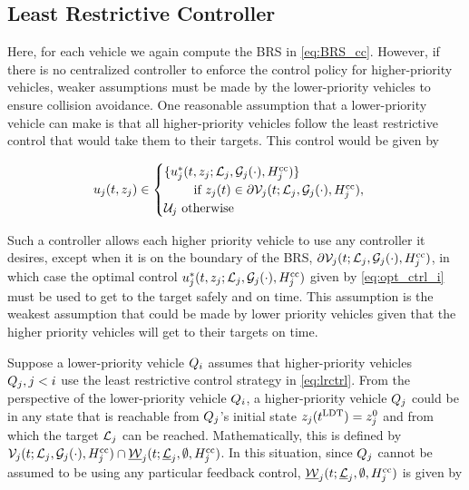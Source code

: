\subsection{Least Restrictive Controller}
\label{sec:incomp_LRctrl}
Here, for each vehicle we again compute the BRS in \eqref{eq:BRS_cc}. However, if there is no centralized controller to enforce the control policy for higher-priority vehicles, weaker assumptions must be made by the lower-priority vehicles to ensure collision avoidance. One reasonable assumption that a lower-priority vehicle can make is that all higher-priority vehicles follow the least restrictive control that would take them to their targets. This control would be given by 

\begin{equation}
\label{eq:lrctrl} %
\ctrl_j(t, \state_j)\in \begin{cases} \{\ctrl_j^*(t, \state_j; \targetset_j, \obsset_j(\cdot), \ccham_j) \} \\ \qquad \text{ if } \state_j(t)\in \partial \brs_j(t; \targetset_j, \obsset_j(\cdot), \ccham_j), \\
\cset_j  \text{ otherwise}
\end{cases}
\end{equation}

Such a controller allows each higher priority vehicle to use any controller it desires, except when it is on the boundary of the BRS, $\partial \mathcal{V}_j(t; \mathcal{L}_j, \mathcal{G}_j(\cdot), H^\text{cc}_j)$, in which case the optimal control $u_j^*(t, z_j; \mathcal{L}_j, \mathcal{G}_j(\cdot), H^\text{cc}_j)$ given by \eqref{eq:opt_ctrl_i} must be used to get to the target safely and on time. This assumption is the weakest assumption that could be made by lower priority vehicles given that the higher priority vehicles will get to their targets on time.

Suppose a lower-priority vehicle $Q_{i}$ assumes that higher-priority vehicles $Q_{j}, j < i$ use the least restrictive control strategy in \eqref{eq:lrctrl}. From the perspective of the lower-priority vehicle $Q_{i}$, a higher-priority vehicle $Q_{j}$ could be in any state that is reachable from $Q_{j}$'s initial state $z_j(t^\text{LDT}) =z_j^0$ and from which the target $\mathcal{L}_j$ can be reached. Mathematically, this is defined by $\mathcal{V}_j(t; \mathcal{L}_j, \mathcal{G}_j(\cdot), H^\text{cc}_j) \cap \underline{\mathcal{W}}_j(t; \underline{\mathcal{L}}_j, \emptyset, H^\text{cc}_j)$. In this situation, since $Q_{j}$ cannot be assumed to be using any particular feedback control, $\underline{\mathcal{W}}_j(t; \underline{\mathcal{L}}_j, \emptyset, H^\text{cc}_j)$ is given by
\vspace{-0.4em}

